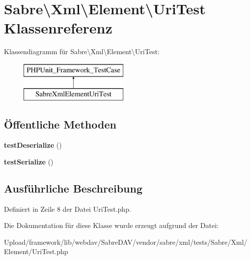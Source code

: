 \hypertarget{class_sabre_1_1_xml_1_1_element_1_1_uri_test}{}\section{Sabre\textbackslash{}Xml\textbackslash{}Element\textbackslash{}Uri\+Test Klassenreferenz}
\label{class_sabre_1_1_xml_1_1_element_1_1_uri_test}
Klassendiagramm für Sabre\textbackslash{}Xml\textbackslash{}Element\textbackslash{}Uri\+Test\+:\begin{figure}[H]
\begin{center}
\leavevmode
\includegraphics[height=2.000000cm]{class_sabre_1_1_xml_1_1_element_1_1_uri_test}
\end{center}
\end{figure}
\subsection*{Öffentliche Methoden}
\begin{DoxyCompactItemize}
\item 
\mbox{\label{class_sabre_1_1_xml_1_1_element_1_1_uri_test_aeb6d6a52a5e1273dd62db0d5048d7a57}} 
{\bfseries test\+Deserialize} ()
\item 
\mbox{\label{class_sabre_1_1_xml_1_1_element_1_1_uri_test_a26557d215860938a89eceb81c4fa3902}} 
{\bfseries test\+Serialize} ()
\end{DoxyCompactItemize}


\subsection{Ausführliche Beschreibung}


Definiert in Zeile 8 der Datei Uri\+Test.\+php.



Die Dokumentation für diese Klasse wurde erzeugt aufgrund der Datei\+:\begin{DoxyCompactItemize}
\item 
Upload/framework/lib/webdav/\+Sabre\+D\+A\+V/vendor/sabre/xml/tests/\+Sabre/\+Xml/\+Element/Uri\+Test.\+php\end{DoxyCompactItemize}
